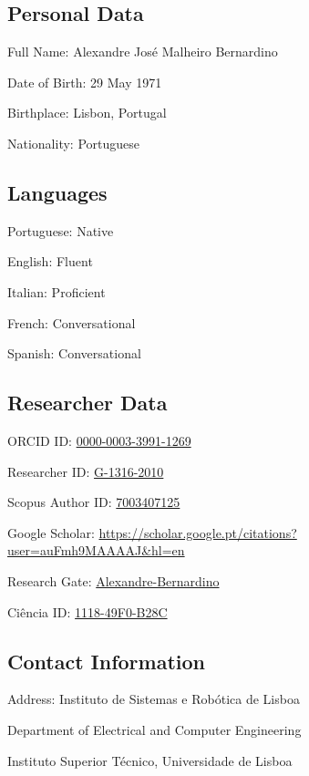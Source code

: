 \documentclass[
]{article}
\begin{document}
\subsection{Personal Data}\label{personal-data}

Full Name: Alexandre José Malheiro Bernardino

Date of Birth: 29 May 1971

Birthplace: Lisbon, Portugal

Nationality: Portuguese

\subsection{Languages}\label{languages}

Portuguese: Native

English: Fluent

Italian: Proficient

French: Conversational

Spanish: Conversational

\subsection{Researcher Data}\label{researcher-data}

ORCID ID:
\href{https://orcid.org/0000-0003-3991-1269}{0000-0003-3991-1269}

Researcher ID:
\href{https://publons.com/researcher/1397657/alexandre-bernardino/}{G-1316-2010}

Scopus Author ID:
\href{https://www.scopus.com/authid/detail.uri?authorId=7003407125}{7003407125}

Google Scholar:
\url{https://scholar.google.pt/citations?user=auFmh9MAAAAJ&hl=en}

Research Gate:
\href{https://www.researchgate.net/profile/Alexandre-Bernardino}{Alexandre-Bernardino}

Ciência ID:
\href{https://www.cienciavitae.pt/pt/1118-49F0-B28C}{1118-49F0-B28C}

\subsection{Contact Information}\label{contact-information}

Address: Instituto de Sistemas e Robótica de Lisboa

Department of Electrical and Computer Engineering

Instituto Superior Técnico, Universidade de Lisboa
\end{document}
